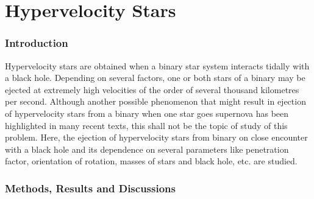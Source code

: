 \documentclass[a4paper]{article}
\begin{document}
	
	\clearpage
	\setcounter{section}{0}
	\part{Hypervelocity Stars} \label{Problem3}


		\section{Introduction} \label{3:introduction}
		
		Hypervelocity stars are obtained when a binary star system interacts tidally with a black hole. Depending on several factors, one or both stars of a binary may be ejected at extremely high velocities of the order of several thousand kilometres per second. Although another possible phenomenon that might result in ejection of hypervelocity stars from a binary when one star goes supernova has been highlighted in many recent texts, this shall not be the topic of study of this problem. Here, the ejection of hypervelocity stars from binary on close encounter with a black hole and its dependence on several parameters like penetration factor, orientation of rotation, masses of stars and black hole, etc. are studied.

		
		\section{Methods, Results and Discussions}
		
\end{document}
